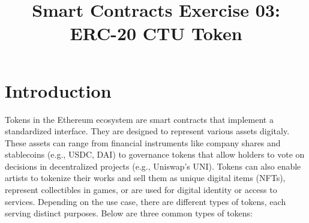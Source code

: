 \documentclass[12pt]{article}
\title{Smart Contracts Exercise 03: \\ ERC-20 CTU Token}
\author{}
\date{}
\begin{document}
\maketitle
\section{Introduction}

Tokens in the Ethereum ecosystem are smart contracts that implement a standardized interface. They are designed to represent various assets digitaly. These assets can range from financial instruments like company shares and stablecoins (e.g., USDC, DAI) to governance tokens that allow holders to vote on decisions in decentralized projects (e.g., Uniswap's UNI). Tokens can also enable artists to tokenize their works and sell them as unique digital items (NFTs), represent collectibles in games, or are used for digital identity or access to services. Depending on the use case, there are different types of tokens, each serving distinct purposes. Below are three common types of tokens:
\end{document}
